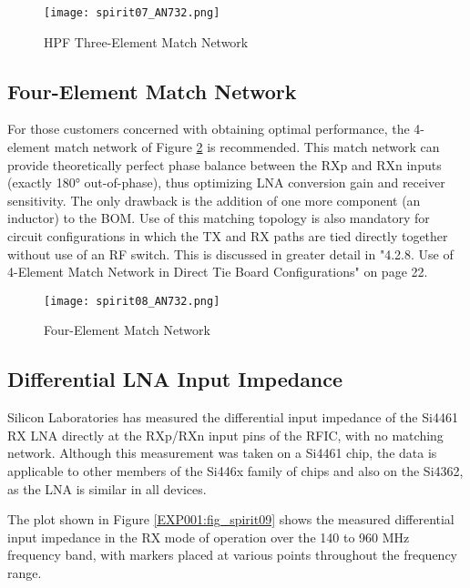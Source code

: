       \begin{figure}[ht!]  %
        \centering
        \texttt{[image: spirit07\_AN732.png]}
        \caption{HPF Three-Element Match Network}
        \label{EXP001:fig_spirit07}
      \end{figure}
      
    \subsection{Four-Element Match Network}
      For those customers concerned with obtaining optimal performance, the 4-element match network of Figure 
      \ref{EXP001:fig_spirit08} is recommended. This match network can provide theoretically perfect phase 
      balance between the RXp and RXn inputs (exactly 180° out-of-phase), thus optimizing LNA conversion gain 
      and receiver sensitivity. The only drawback is the addition of one more component (an inductor) to the 
      BOM. Use of this matching topology is also mandatory for circuit configurations in which the TX and RX 
      paths are tied directly together without use of an RF switch. This is discussed in greater detail in 
      "4.2.8. Use of 4-Element Match Network in Direct Tie Board Configurations" on page 22.
      \begin{figure}[ht!]  %
        \centering
        \texttt{[image: spirit08\_AN732.png]}
        \caption{Four-Element Match Network}
        \label{EXP001:fig_spirit08}
      \end{figure}
    
    \subsection{Differential LNA Input Impedance} 
      Silicon Laboratories has measured the differential input impedance of the Si4461 RX LNA directly at 
      the RXp/RXn input pins of the RFIC, with no matching network. Although this measurement was taken on a 
      Si4461 chip, the data is applicable to other members of the Si446x family of chips and also on the 
      Si4362, as the LNA is similar in all devices.
      
      The plot shown in Figure \ref{EXP001:fig_spirit09} shows the measured differential input impedance in 
      the RX mode of operation over the 140 to 960 MHz frequency band, with markers placed at various points 
      throughout the frequency range.
      
